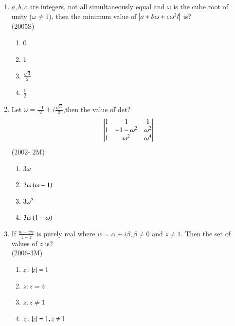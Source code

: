 \documentclass[journal,12pt,twocolumn]{IEEEtran}
\theoremstyle{remark}
\begin{document}
\begin{enumerate}
\item $a,b,c$ are integers, not all simultaneously equal and $\omega$ is the cube root of unity ($\omega \neq 1$), then the minimum value of $\left\vert a+b\omega+c\omega^{2}l\right\vert$ is?         \\

        \hfill{(2005S)}
		\begin{multicols}{4}
\begin{enumerate}[label=(\alph*)]
	\item $0$
	\item $1$
	\item $\frac{\sqrt{3}}{2}$
	\item $\frac{1}{2}$
\end{enumerate}
                 \end{multicols}

\item Let $\omega=\frac{-1}{2}+i\frac{\sqrt{3}}{2}$,then the value of det?\\
	\begin{align}
		\begin{vmatrix}
	1     &1               &1            \\
	1     &-1-\omega^{2}   &\omega^{2}   \\
	1     &\omega^{2}      &\omega^{4}
                      \end{vmatrix}
	\end{align}
	\hfill{(2002- 2M)}
		\begin{multicols}{2}
\begin{enumerate}[label=(\alph*)]
	\item $3\omega$
	\item $3\omega\left(\omega-1\right)$
	\item $3\omega^{2}$
	\item $3\omega\left(1-\omega\right)$
\end{enumerate}
		\end{multicols}

\item If $\frac{w-\overline{w}z}{1-z}$ is purely real where $w=\alpha+i\beta, \beta \neq 0$ and $z \neq 1$. Then the set of values of $z$ is?                     \\

	\hfill{(2006-3M)}
		\begin{multicols}{2}
\begin{enumerate}[label=(\alph*)]
	\item {$z:\left\vert z\right\vert=1$}
	\item {$z:z= \overline{z}$}
	\item {$z:z \neq 1 $}
	\item {$z:\left\vert z\right\vert=1, z\neq1$}
\end{enumerate}
		\end{multicols}


\end{enumerate}
\end{document}
